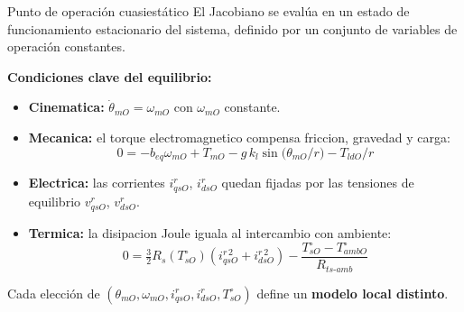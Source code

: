 \documentclass[aspectratio=169,t]{beamer}
\begin{document}
\begin{frame}{Punto de operación cuasiestático}
{\small\color{uncGray}El Jacobiano se evalúa en un estado de funcionamiento estacionario del sistema, definido por un conjunto de variables de operación constantes.}\par
\vspace{3mm}

\textbf{Condiciones clave del equilibrio:}
\begin{itemize}
  \item \textbf{Cinematica:} $\dot{\theta}_{mO}=\omega_{mO}$ con $\omega_{mO}$ constante.
  \item \textbf{Mecanica:} el torque electromagnetico compensa friccion, gravedad y carga:
  \[
  0=-b_{eq}\omega_{mO}+T_{mO}-g\,k_l\sin\!\big(\theta_{mO}/r\big)-T_{ldO}/r
  \]
  \item \textbf{Electrica:} las corrientes $i_{qsO}^r$, $i_{dsO}^r$ quedan fijadas por las tensiones de equilibrio $v_{qsO}^r$, $v_{dsO}^r$.
  \item \textbf{Termica:} la disipacion Joule iguala al intercambio con ambiente:
  \[
  0=\tfrac{3}{2}R_s(T_{sO}^\circ)\!\left(i_{qsO}^{r\,2}+i_{dsO}^{r\,2}\right)-\frac{T_{sO}^\circ-T_{ambO}^\circ}{R_{ts\text{-}amb}}
  \]
\end{itemize}

{\small Cada elección de $(\theta_{mO},\omega_{mO},i_{qsO}^r,i_{dsO}^r,T_{sO}^\circ)$ define un \textbf{modelo local distinto}.}
\end{frame}
\end{document}
